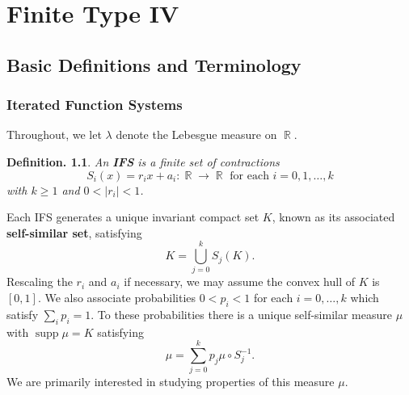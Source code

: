 \documentclass[11pt, a4paper]{memoir}
\DeclareMathOperator{\N}{{\mathbb{N}}}
\DeclareMathOperator{\R}{{\mathbb{R}}}
\theoremstyle{change}
\theoremstyle{plain}
\theoremstyle{nonumberplain}
\newtheorem{definition}{Definition.}
\DeclareMathOperator{\supp}{supp}
\numberwithin{equation}{section}
\begin{document}

\chapter{Finite Type IV}
\section{Basic Definitions and Terminology}
\subsection{Iterated Function Systems}
Throughout, we let $\lambda$ denote the Lebesgue measure on $\R$.
\begin{definition}
    An \textbf{IFS} is a finite set of contractions
    \begin{equation*}
        S_i(x) = r_ix+a_i:\R\to\R\text{ for each }i=0,1,\ldots,k
    \end{equation*}
    with $k\geq 1$ and $0<|r_i|<1$.
\end{definition}
Each IFS generates a unique invariant compact set $K$, known as its associated \textbf{self-similar set}, satisfying
\begin{equation*}
    K=\bigcup_{j=0}^kS_j(K).
\end{equation*}
Rescaling the $r_i$ and $a_i$ if necessary, we may assume the convex hull of $K$ is $[0,1]$.
We also associate probabilities $0<p_i<1$ for each $i=0,\ldots,k$ which satisfy $\sum_i p_i=1$.
To these probabilities there is a unique self-similar measure $\mu$ with $\supp\mu=K$ satisfying
\begin{equation}
    \mu=\sum_{j=0}^k p_j\mu\circ S_j^{-1}.\label{e:mu-def}
\end{equation}
We are primarily interested in studying properties of this measure $\mu$.
\end{document}
